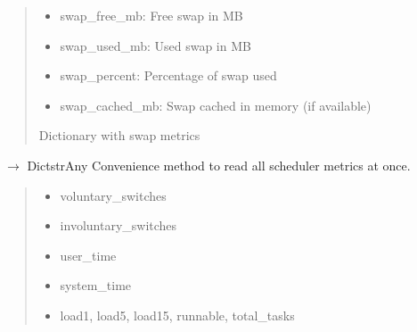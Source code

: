 \documentclass[letterpaper,10pt,english]{sphinxmanual}
\begin{document}
\begin{fulllineitems}
\begin{fulllineitems}
\begin{quote}
\begin{description}
\begin{itemize}
\item {} 
\sphinxAtStartPar
swap\_free\_mb: Free swap in MB

\item {} 
\sphinxAtStartPar
swap\_used\_mb: Used swap in MB

\item {} 
\sphinxAtStartPar
swap\_percent: Percentage of swap used

\item {} 
\sphinxAtStartPar
swap\_cached\_mb: Swap cached in memory (if available)

\end{itemize}


\sphinxAtStartPar
Dictionary with swap metrics

\end{description}\end{quote}

\end{fulllineitems}


\begin{fulllineitems}
\label{\detokenize{core.readers.scheduler_monitor:core.readers.scheduler_monitor.SchedulerMonitor.read_all}}
\pysigstartsignatures
\pysiglinewithargsret
{}
{}
{{ $\rightarrow$ Dict\DUrole{p}{{[}}strAny\DUrole{p}{{]}}}}
\pysigstopsignatures
\sphinxAtStartPar
Convenience method to read all scheduler metrics at once.
\begin{quote}\begin{description}
\sphinxAtStartPar
\begin{itemize}
\item {} 
\sphinxAtStartPar
voluntary\_switches

\item {} 
\sphinxAtStartPar
involuntary\_switches

\item {} 
\sphinxAtStartPar
user\_time

\item {} 
\sphinxAtStartPar
system\_time

\item {} 
\sphinxAtStartPar
load1, load5, load15, runnable, total\_tasks

\end{itemize}



\end{description}
\end{quote}
\end{fulllineitems}
\end{fulllineitems}
\end{document}
